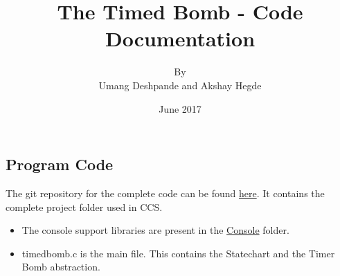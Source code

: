 \documentclass{article}
\title{The Timed Bomb - Code Documentation}
\author{By \\ Umang Deshpande and Akshay Hegde}
\date{June 2017}
\begin{document}
\maketitle

\subsection{Program Code}
\qquad The git repository for the complete code can be found \href{https://github.com/eYSIP-2017/eYSIP-2017_Game_Development-TI-RTOS/tree/master/Documentation/Timer\%20Bomb/Timer\%20Bomb\%20-\%20Code/TimedBomb_Final}{here}. It contains the complete project folder used in CCS. 
\begin{itemize}
  \item The console support libraries are present in the \href{https://github.com/eYSIP-2017/eYSIP-2017_Game_Development-TI-RTOS/tree/master/Documentation/Timer\%20Bomb/Timer\%20Bomb\%20-\%20Code/TimedBomb_Final/Console}{Console} folder. 
  \item timedbomb.c is the main file. This contains the Statechart and  the Timer Bomb abstraction.
\end{itemize}
\end{document}
